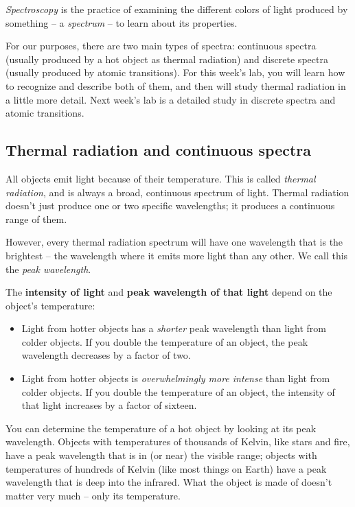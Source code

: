 \documentclass[11pt]{article}
\begin{document}
{\it Spectroscopy} is the practice of examining the different colors of light produced by something -- a {\it spectrum} -- to learn about
its properties.

For our purposes, there are two main types of spectra: continuous spectra (usually produced by a hot object as thermal radiation) and discrete spectra (usually produced by atomic transitions). For this week's lab, you will learn how to recognize and describe both of them, and then will study thermal radiation in a little more detail. Next week's lab is a detailed study in discrete spectra and atomic transitions.

\subsection{Thermal radiation and continuous spectra}

All objects emit light because of their temperature. This is called {\it thermal radiation}, and is always a broad, continuous spectrum of light. Thermal radiation doesn't just produce one or two specific wavelengths; it produces a continuous range of them. 

However, every thermal radiation spectrum will have one wavelength that is the brightest -- the wavelength where it emits more light than any other. We call this the {\it peak wavelength}.

The {\bf intensity of light} and {\bf peak wavelength of that light} depend on the object's temperature:

\begin{itemize}
\item Light from hotter objects has a {\it shorter} peak wavelength than light from colder objects. If you double the temperature of an object, the peak wavelength decreases by a factor of two.

\item Light from hotter objects is {\it overwhelmingly more intense} than light from colder objects. If you double the temperature of an object, the intensity of that light increases by a factor of sixteen.
\end{itemize}

You can determine the temperature of a hot object by looking at its peak wavelength. Objects with temperatures of thousands of Kelvin, like stars and fire, have a peak wavelength that is in (or near) the visible range; objects with temperatures of hundreds of Kelvin (like most things on Earth) have a peak wavelength that is deep into the infrared. What the object is made of doesn't matter very much -- only its temperature.
\end{document}
